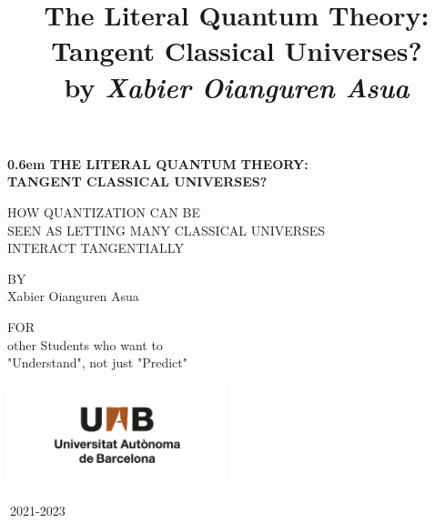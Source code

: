 \documentclass[11pt, a4paper]{article} %
\title{\vspace{-2cm} {\bf The Literal Quantum Theory:\\ Tangent Classical Universes?}\\{\small by {\em Xabier Oianguren Asua}}\vspace{-0.8cm}}
\date{\vspace{-11ex}}
\begin{document}
\clearpage
\newcommand\nbvspace[1][3]{\vspace*{\stretch{#1}}}
\newcommand\nbstretchyspace{\spaceskip0.5em plus 0.25em minus 0.25em}
\newcommand{\nbtitlestretch}{\spaceskip0.6em}
\pagestyle{empty}
\begin{center}
\bfseries
\nbvspace[1]
\Huge
{\nbtitlestretch\huge
THE LITERAL QUANTUM THEORY:\\
TANGENT CLASSICAL UNIVERSES?
}

\nbvspace[1]
\normalsize

HOW QUANTIZATION CAN BE\\
SEEN AS LETTING MANY CLASSICAL UNIVERSES\\
INTERACT TANGENTIALLY

\nbvspace[1]


\nbvspace[1]
\small BY\\
\Large Xabier Oianguren Asua\\[0.5em]
\nbvspace[2]

\small FOR \\
\normalsize
other Students who want to\\
"Understand", not just "Predict"

\nbvspace[4]

\includegraphics[width=2.5in]{UAB.png}
\normalsize
\vspace{-0.5cm}

\large
\small
\small
$\ $2021-2023
\nbvspace[1]
\end{center}
\newpage
\null
\clearpage
\end{document}
